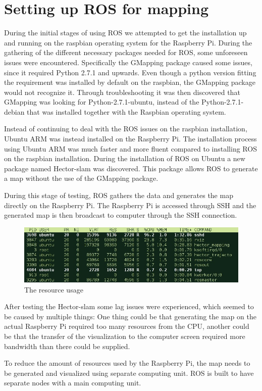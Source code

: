 \clearpage
\section{Setting up ROS for mapping}

During the initial stages of using ROS we attempted to get the installation up and running on the raspbian operating system for the Raspberry Pi. During the gathering of the different necessary packages needed for ROS, some unforeseen issues were encountered. Specifically the GMapping package caused some issues, since it required Python 2.7.1 and upwards. Even though a python version fitting the requirement was installed by default on the raspbian, the GMapping package would not recognize it. Through troubleshooting it was then discovered that GMapping was looking for Python-2.7.1-ubuntu, instead of the Python-2.7.1-debian that was installed together with the Raspbian operating system.

Instead of continuing to deal with the ROS issues on the raspbian installation, Ubuntu ARM was instead installed on the Raspberry Pi.
The installation process using Ubuntu ARM was much faster and more fluent compared to installing ROS on the raspbian installation. During the installation of ROS on Ubuntu a new package named Hector-slam was discovered. 
This package allows ROS to generate a map without the use of the GMapping package.

During this stage of testing, ROS gathers the data and generates the map directly on the Raspberry Pi. The Raspberry Pi is accessed through SSH and the generated map is then broadcast to computer through the SSH connection.

\begin{figure}[H]
	\centering
	\includegraphics[width=.8\linewidth]{images/rvisScreenshotCropped.jpg}
	\caption{The resource usage}
\end{figure}


After testing the Hector-slam some lag issues were experienced, which seemed to be caused by multiple things: One thing could be that generating the map on the actual Raspberry Pi required too many resources from the CPU, another could be that the transfer of the visualization to the computer screen required more bandwidth than there could be supplied.

To reduce the amount of resources used by the Raspberry Pi, the map needs to be generated and visualized using separate computing unit. ROS is built to have separate nodes with a main computing unit.

